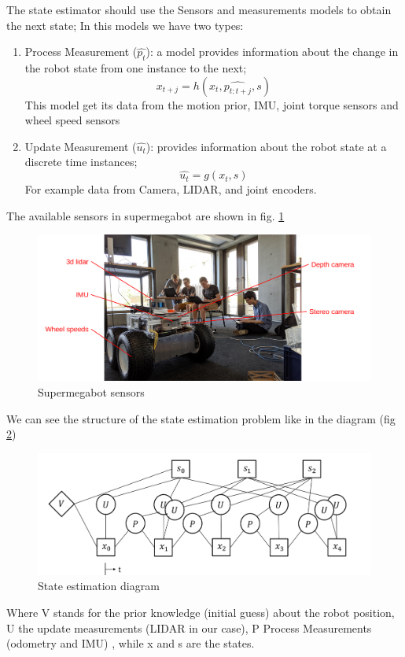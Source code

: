 \documentclass[a4paper,12pt]{article}
\begin{document}
The state estimator should use the Sensors and measurements models to obtain the next state; In this models we have two types:
\begin{enumerate}
    \item Process Measurement ($\hat{p_t}$): a model provides information about the change in the robot state from one instance to the next;
    $$x_{t+j}=h(x_t,\hat{p_{t:t+j}},s)$$
    This model get its data from the motion prior, IMU, joint torque sensors and wheel speed sensors
    \item Update Measurement ($\hat{u_t}$): provides information about the robot state at a discrete time instances;
    $$\hat{u_t}=g(x_t,s)$$
    For example data from Camera, LIDAR, and joint encoders.
\end{enumerate}
 The available sensors in supermegabot are shown in fig. \ref{fig:smb_sensors}
\begin{figure}[H]
\centering
\includegraphics[width=\textwidth]{img/smb_sensors.png}
\caption{Supermegabot sensors}
\label{fig:smb_sensors}
\end{figure}

We can see the structure of the state estimation problem like in the diagram (fig \ref{fig:dia1})
\begin{figure}[H]
\centering
\includegraphics[width=\textwidth]{img/dia1.png}
\caption{State estimation diagram}
\label{fig:dia1}
\end{figure}

Where V stands for the prior knowledge (initial guess) about the robot position, U the update measurements (LIDAR in our case), P Process Measurements (odometry and IMU) , while x and s are the states.
\end{document}
